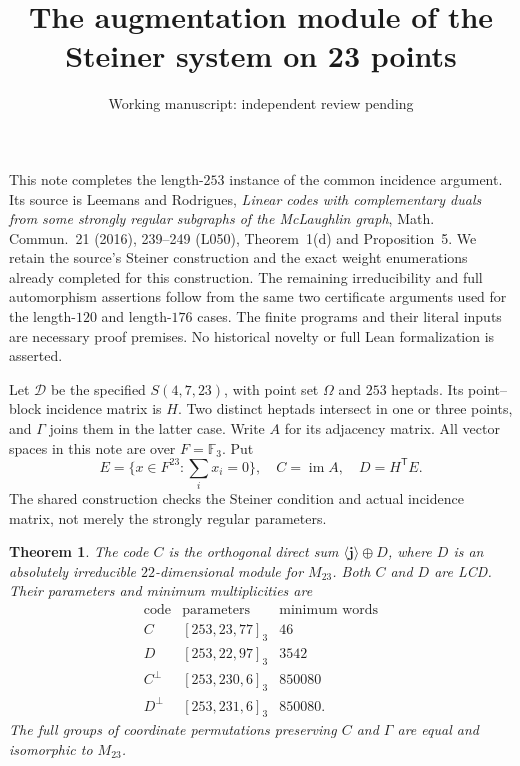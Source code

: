 \documentclass[11pt]{article}
\title{The augmentation module of the Steiner system on 23 points}
\author{Working manuscript: independent review pending}
\date{}
\newtheorem{theorem}{Theorem}
\newcommand{\im}{\operatorname{im}}
\begin{document}
\maketitle

This note completes the length-$253$ instance of the common incidence
argument. Its source is Leemans and Rodrigues, \emph{Linear codes with
complementary duals from some strongly regular subgraphs of the McLaughlin
graph}, Math. Commun.\ 21 (2016), 239--249 (L050), Theorem~1(d) and
Proposition~5. We retain the source's Steiner construction and the exact
weight enumerations already completed for this construction. The remaining
irreducibility and full automorphism assertions follow from the same two
certificate arguments used for the length-$120$ and length-$176$ cases.
The finite programs and their literal inputs are necessary proof premises.
No historical novelty or full Lean formalization is asserted.

Let $\mathcal D$ be the specified $S(4,7,23)$, with point set $\Omega$
and $253$ heptads. Its point--block incidence matrix is $H$.
Two distinct heptads intersect in one or three points, and $\Gamma$ joins
them in the latter case. Write $A$ for its adjacency matrix. All vector
spaces in this note are over $F=\mathbb F_3$. Put
\[
 E=\{x\in F^{23}:\textstyle\sum_i x_i=0\},\quad
 C=\im A,\quad D=H^{\mathsf T}E.
\]
The shared construction checks the Steiner condition and actual incidence
matrix, not merely the strongly regular parameters.

\begin{theorem}
The code $C$ is the orthogonal direct sum $\langle\mathbf j\rangle\oplus D$,
where $D$ is an absolutely irreducible $22$-dimensional module for $M_{23}$.
Both $C$ and $D$ are LCD. Their parameters and minimum multiplicities are
\[
\begin{array}{c|c|r}
\text{code}&\text{parameters}&\text{minimum words}\\\hline
C &[253,23,77]_3&46\\
D &[253,22,97]_3&3542\\
C^\perp &[253,230,6]_3&850080\\
D^\perp &[253,231,6]_3&850080.
\end{array}
\]
The full groups of coordinate permutations preserving $C$ and $\Gamma$
are equal and isomorphic to $M_{23}$.
\end{theorem}
\end{document}
